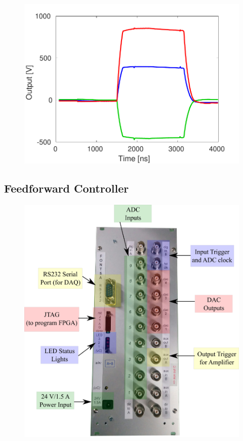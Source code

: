 \documentclass[%
 reprint,
 superscriptaddress,
 amsmath,
 amssymb,
 prstab,
]{revtex4-1}
\begin{document}
\begin{figure}
	\includegraphics[width=\columnwidth]{figs/hw/AmpL_Traces}%
	\caption{\label{f:AmpL_Traces}
	}
\end{figure}

\subsection{\label{ss:font}Feedforward Controller}

\begin{figure}
	\includegraphics[width=\columnwidth]{figs/hw/FONT5aPanel}%
	\caption{\label{f:FONT5aPanel}
	}
\end{figure}
\end{document}
